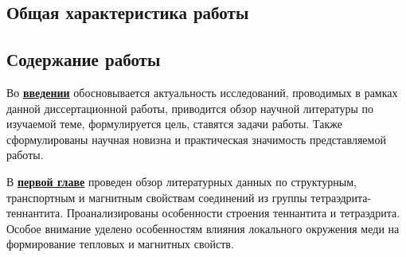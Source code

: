 \subsection*{Общая характеристика работы}

\newcommand{\actuality}{\underline{\textbf{Актуальность темы.}}}
\newcommand{\aim}{\underline{\textbf{Целью}}}
\newcommand{\tasks}{\underline{\textbf{задачи}}}
\newcommand{\defpositions}{\underline{\textbf{Основные положения, выносимые на~защиту:}}}
\newcommand{\novelty}{\underline{\textbf{Научная новизна:}}}
\newcommand{\influence}{\underline{\textbf{Научная и практическая значимость}}}
\newcommand{\reliability}{\underline{\textbf{Достоверность}}}
\newcommand{\probation}{\underline{\textbf{Апробация работы.}}}
\newcommand{\contribution}{\underline{\textbf{Личный вклад.}}}
\newcommand{\publications}{\underline{\textbf{Публикации.}}}






\subsection*{Содержание работы}
Во \underline{\textbf{введении}} обосновывается актуальность исследований, проводимых в рамках данной диссертационной работы, приводится обзор научной литературы по изучаемой теме, формулируется цель, ставятся задачи работы. Также сформулированы научная новизна и практическая значимость представляемой работы.

В \underline{\textbf{первой главе}} проведен обзор литературных данных по структурным, транспортным и магнитным свойствам соединений из группы тетраэдрита-теннантита. Проанализированы особенности строения теннантита и тетраэдрита. Особое внимание уделено особенностям влияния локального окружения меди на формирование тепловых и магнитных свойств.

